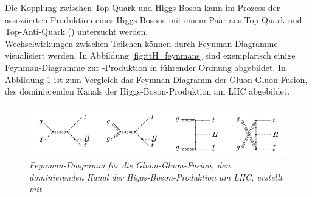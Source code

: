 Die Kopplung zwischen Top-Quark und Higgs-Boson kann im Prozess der assoziierten Produktion eines Higgs-Bosons mit einem Paar aus Top-Quark und Top-Anti-Quark (\ttH) untersucht werden.\\
Wechselwirkungen zwischen Teilchen k\"onnen durch Feynman-Diagramme visualisiert werden. In Abbildung \ref{fig:ttH_feynmans} sind exemplarisch einige Feynman-Diagramme zur \ttH-Produktion in f\"uhrender Ordnung abgebildet.%
In Abbildung \ref{fig:gluonfusion} ist zum Vergleich das Feynman-Diagramm der Gluon-Gluon-Fusion, des dominierenden Kanals der Higgs-Boson-Produktion am LHC abgebildet.

\begin{figure}[hhh]
 \begin{center}
   \includegraphics[width=\textwidth]{graphics/ttH_feynmans.png}
   \parbox[b]{12cm}{
     \caption[\ttH Feynman-Diagramme]
             {\label{fig:ttH_feynmans} {\label{fig:gluonfusion} \it\!Feynman-Diagramm f\"ur die Gluon-Gluon-Fusion, den dominierenden Kanal der Higgs-Boson-Produktion am LHC, erstellt mit \cite{feynman_draw}}}}
 \end{center}
\end{figure}